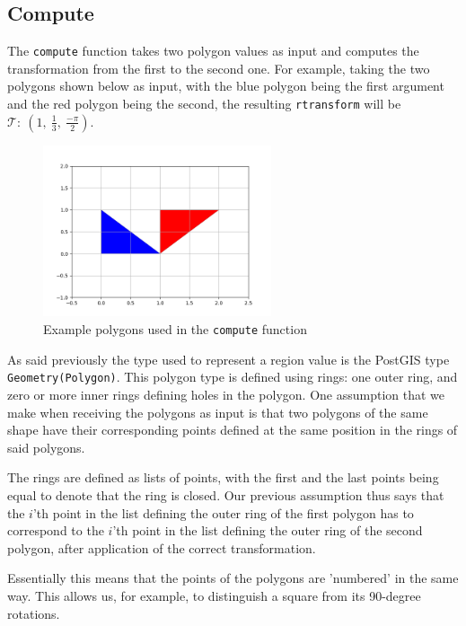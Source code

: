 \subsection{Compute}
\label{section:compute}

The \lstinline{compute} function takes two polygon values as input and computes the transformation from the first to the second one. For example, taking the two polygons shown below as input, with the blue polygon being the first argument and the red polygon being the second, the resulting \lstinline{rtransform} will be $\mathcal{T}:\ (1,\ \frac{1}{3},\ \frac{-\pi}{2})$.

\begin{figure}[h!]
    \centering
    \includegraphics[width=0.6\textwidth]{images/example_simple_transformation.png}
    \caption{Example polygons used in the \lstinline{compute} function}
    \label{fig:example_compute}
\end{figure}


As said previously the type used to represent a region value is the PostGIS type \lstinline{Geometry(Polygon)}. This polygon type is defined using rings: one outer ring, and zero or more inner rings defining holes in the polygon. One assumption that we make when receiving the polygons as input is that two polygons of the same shape have their corresponding points defined at the same position in the rings of said polygons. 

The rings are defined as lists of points, with the first and the last points being equal to denote that the ring is closed. Our previous assumption thus says that the $i$'th point in the list defining the outer ring of the first polygon has to correspond to the $i$'th point in the list defining the outer ring of the second polygon, after application of the correct transformation.

Essentially this means that the points of the polygons are 'numbered' in the same way. This allows us, for example, to distinguish a square from its 90-degree rotations. \\

